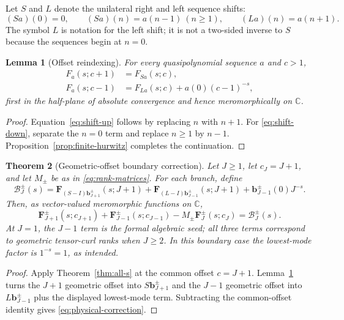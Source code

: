 \documentclass[11pt]{article}
\newtheorem{theorem}{Theorem}[section]
\newtheorem{lemma}[theorem]{Lemma}
\theoremstyle{definition}
\newcommand{\C}{\mathbb C}
\begin{document}
Let $S$ and $L$ denote the unilateral right and left sequence shifts:
\begin{equation}
 (Sa)(0)=0,\qquad (Sa)(n)=a(n-1)\ (n\geq1),
 \qquad
 (La)(n)=a(n+1).
 \label{eq:unilateral-shifts}
\end{equation}
The symbol $L$ is notation for the left shift; it is not a two-sided
inverse to $S$ because the sequences begin at $n=0$.

\begin{lemma}[Offset reindexing]
\label{lem:offset}
For every quasipolynomial sequence $a$ and $c>1$,
\begin{align}
 F_a(s;c+1)&=F_{Sa}(s;c),
 \label{eq:shift-up}\\
 F_a(s;c-1)&=F_{La}(s;c)+a(0)(c-1)^{-s},
 \label{eq:shift-down}
\end{align}
first in the half-plane of absolute convergence and hence
meromorphically on $\C$.
\end{lemma}

\begin{proof}
Equation~\eqref{eq:shift-up} follows by replacing $n$ with $n+1$.
For \eqref{eq:shift-down}, separate the $n=0$ term and replace
$n\geq1$ by $n-1$.  Proposition~\ref{prop:finite-hurwitz} completes
the continuation.
\end{proof}

\begin{theorem}[Geometric-offset boundary correction]
\label{thm:physical-offset}
Let $J\geq1$, let $c_J=J+1$, and let $M_\pm$ be as in
\eqref{eq:rank-matrices}.  For each branch, define
\[
 \boldsymbol{\mathcal B}_J^\pm(s)
 =
 \boldsymbol F_{(S-I)\boldsymbol b_{J+1}^\pm}(s;J+1)
 +\boldsymbol F_{(L-I)\boldsymbol b_{J-1}^\pm}(s;J+1)
 +\boldsymbol b_{J-1}^\pm(0)J^{-s}.
\]
Then, as vector-valued meromorphic functions on $\C$,
\begin{equation}
 \boxed{\;
 \boldsymbol F_{J+1}^\pm(s;c_{J+1})
 +\boldsymbol F_{J-1}^\pm(s;c_{J-1})
 -M_\pm\boldsymbol F_J^\pm(s;c_J)
 =
 \boldsymbol{\mathcal B}_J^\pm(s).
 \;}
\label{eq:physical-correction}
\end{equation}
At $J=1$, the $J-1$ term is the formal algebraic seed; all three
terms correspond to geometric tensor-curl ranks when $J\geq2$.  In this
boundary case the lowest-mode factor is $1^{-s}=1$, as intended.
\end{theorem}

\begin{proof}
Apply Theorem~\ref{thm:all-s} at the common offset $c=J+1$.
Lemma~\ref{lem:offset} turns the $J+1$ geometric offset into
$S\boldsymbol b_{J+1}^\pm$ and the $J-1$ geometric offset into
$L\boldsymbol b_{J-1}^\pm$ plus the displayed lowest-mode term.
Subtracting the common-offset identity gives
\eqref{eq:physical-correction}.
\end{proof}
\end{document}
